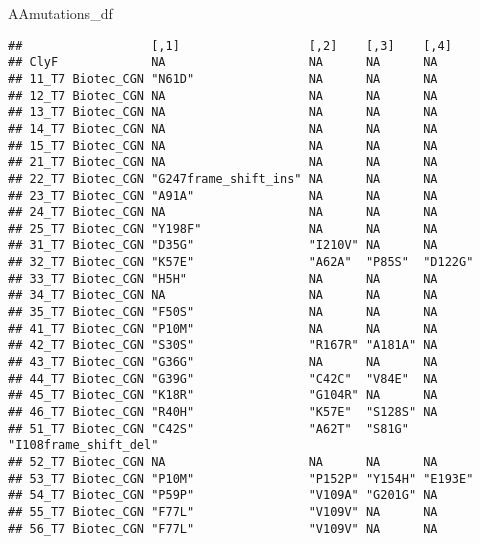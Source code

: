 \documentclass[
]{article}
\newenvironment{Shaded}{\begin{snugshade}}{\end{snugshade}}
\newcommand{\NormalTok}[1]{#1}
\begin{document}
\begin{Shaded}
\begin{Highlighting}[]
\NormalTok{AAmutations\_df}
\end{Highlighting}
\end{Shaded}

\begin{verbatim}
##                  [,1]                  [,2]    [,3]    [,4]                 
## ClyF             NA                    NA      NA      NA                   
## 11_T7 Biotec_CGN "N61D"                NA      NA      NA                   
## 12_T7 Biotec_CGN NA                    NA      NA      NA                   
## 13_T7 Biotec_CGN NA                    NA      NA      NA                   
## 14_T7 Biotec_CGN NA                    NA      NA      NA                   
## 15_T7 Biotec_CGN NA                    NA      NA      NA                   
## 21_T7 Biotec_CGN NA                    NA      NA      NA                   
## 22_T7 Biotec_CGN "G247frame_shift_ins" NA      NA      NA                   
## 23_T7 Biotec_CGN "A91A"                NA      NA      NA                   
## 24_T7 Biotec_CGN NA                    NA      NA      NA                   
## 25_T7 Biotec_CGN "Y198F"               NA      NA      NA                   
## 31_T7 Biotec_CGN "D35G"                "I210V" NA      NA                   
## 32_T7 Biotec_CGN "K57E"                "A62A"  "P85S"  "D122G"              
## 33_T7 Biotec_CGN "H5H"                 NA      NA      NA                   
## 34_T7 Biotec_CGN NA                    NA      NA      NA                   
## 35_T7 Biotec_CGN "F50S"                NA      NA      NA                   
## 41_T7 Biotec_CGN "P10M"                NA      NA      NA                   
## 42_T7 Biotec_CGN "S30S"                "R167R" "A181A" NA                   
## 43_T7 Biotec_CGN "G36G"                NA      NA      NA                   
## 44_T7 Biotec_CGN "G39G"                "C42C"  "V84E"  NA                   
## 45_T7 Biotec_CGN "K18R"                "G104R" NA      NA                   
## 46_T7 Biotec_CGN "R40H"                "K57E"  "S128S" NA                   
## 51_T7 Biotec_CGN "C42S"                "A62T"  "S81G"  "I108frame_shift_del"
## 52_T7 Biotec_CGN NA                    NA      NA      NA                   
## 53_T7 Biotec_CGN "P10M"                "P152P" "Y154H" "E193E"              
## 54_T7 Biotec_CGN "P59P"                "V109A" "G201G" NA                   
## 55_T7 Biotec_CGN "F77L"                "V109V" NA      NA                   
## 56_T7 Biotec_CGN "F77L"                "V109V" NA      NA                   

\end{verbatim}
\end{document}
